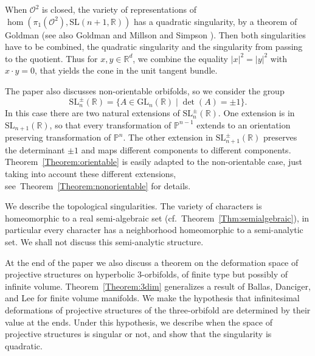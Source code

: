 \documentclass[a4paper,11pt]{article}
\begin{document}
When $ \mathcal O^2  $ is closed,  the variety of representations of 
$\hom(\pi_1(\mathcal O^2), \mathrm{SL}(n+ 1,\mathbb R)) $ has a quadratic singularity, by 
a theorem of Goldman \cite{GoldmanMaryland}
(see also Goldman and Millson  \cite{GoldmanMillson}  and Simpson \cite{Simpson}). Then both singularities
have to be combined, the quadratic singularity and the singularity from passing to the quotient.
Thus for $x, y\in \mathbb R^d$, we combine the equality $|x|^2=|y|^2$ with $x\cdot y=0$,
that yields the cone in the unit tangent bundle. 


The paper also discusses non-orientable orbifolds, 
so we consider  the group
$$\mathrm{SL}^{\pm}_n(\mathbb R ) 
 =\{A\in\textrm{GL}_n(\mathbb R)\mid \det (A)=\pm 1\}.
 $$
In this case there are two natural extensions  of 
$ \mathrm{SL}^{\pm}_n(\mathbb R )$.  One extension is in  $\mathrm{SL}_{n+1}(\mathbb R)$, so that
every transformation of $\mathbb P^{n-1}$  extends to an orientation preserving transformation of $\mathbb P^n$. 
The other extension  in  $\mathrm{SL}^{\pm}_{n+1}(\mathbb R)$ preserves the determinant $\pm 1$ and maps different components to different components.
Theorem~\ref{Theorem:orientable} is easily adapted to the non-orientable case, just 
taking into account these different extensions, 
see~Theorem~\ref{Theorem:nonorientable} for details.

We describe the topological singularities.
The variety of characters is homeomorphic to a real semi-algebraic set 
(cf.~Theorem~\ref{Thm:semialgebraic}), in particular every character has a neighborhood homeomorphic to a semi-analytic set. We shall not discuss this semi-analytic structure.


\bigskip

At the end of the  paper we also discuss a theorem on 
the deformation space of projective structures on hyperbolic 3-orbifolds, of finite type but
possibly of infinite volume. Theorem~\ref{Theorem:3dim}
 generalizes  a result of
Ballas, Danciger, and Lee \cite[Theorem~3.2]{BDL} for finite volume manifolds.
We make the hypothesis that infinitesimal deformations of projective structures of the three-orbifold are determined by their value at the ends.
 Under this hypothesis, we describe  when the space of projective structures is singular or not, and show that the singularity is quadratic.


\medskip
\end{document}
